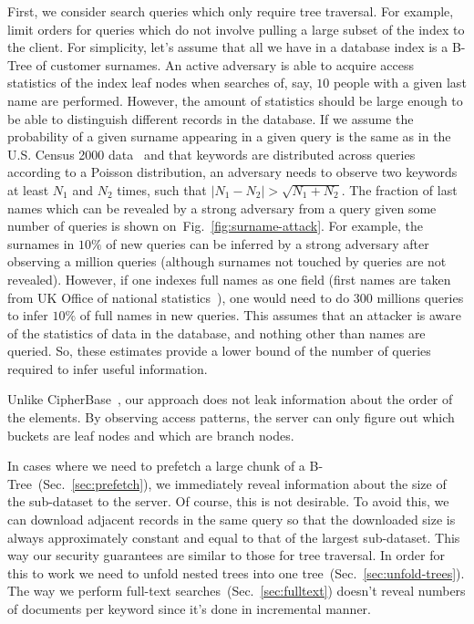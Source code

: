 \documentclass[notitlepage,longbibliography]{revtex4-1}
\newcommand{\figref}[1]{Fig.~\ref{#1}}
\begin{document}
First, we consider search queries which only require tree traversal.
For example, limit orders for queries which do not involve pulling a large subset of the index to the client.
For simplicity, let's assume that all we have in a database index is a B-Tree of customer surnames.
An active adversary is able to acquire access statistics of the index leaf nodes when searches of, say, $10$ people with a given last name are performed.
However, the amount of statistics should be large enough to be able to distinguish different records in the database.
If we assume the probability of a given surname appearing in a given query is the same as in the U.S. Census 2000 data~\cite{us-census-surnames}
and that keywords are distributed across queries according to a Poisson distribution,
an adversary needs to observe two keywords at least $N_1$ and $N_2$ times, such that $|N_1 - N_2| > \sqrt{N_1 + N_2}$.
The fraction of last names which can be revealed by a strong adversary from a query given some number of queries is shown on~\figref{fig:surname-attack}.
For example, the surnames in $10\%$ of new queries can be inferred by a strong adversary after observing a million queries (although surnames not touched by queries are not revealed).
However, if one indexes full names as one field (first names are taken from UK Office of national statistics~\cite{uk-first-names}),
one would need to do $300$ millions queries to infer $10\%$ of full names in new queries.
This assumes that an attacker is aware of the statistics of data in the database, and nothing other than names are queried.
So, these estimates provide a lower bound of the number of queries required to infer useful information.

Unlike CipherBase~\cite{cipherbase}, our approach does not leak information about the order of the elements.
By observing access patterns, the server can only figure out which buckets are leaf nodes and which are branch nodes.

In cases where we need to prefetch a large chunk of a B-Tree~(Sec.~\ref{sec:prefetch}), we immediately reveal information about the size of the sub-dataset to the server.
Of course, this is not desirable.
To avoid this, we can download adjacent records in the same query so that the downloaded size is always approximately constant and equal to that of the largest sub-dataset.
This way our security guarantees are similar to those for tree traversal.
In order for this to work we need to unfold nested trees into one tree~(Sec.~\ref{sec:unfold-trees}).
The way we perform full-text searches~(Sec.~\ref{sec:fulltext}) doesn't reveal numbers of documents per keyword since it's done in incremental manner.
\end{document}
